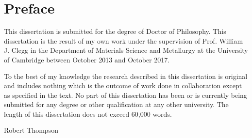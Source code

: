 
\clearpage

\doublespacing

\section*{Preface}



\noindent
This dissertation is submitted for the degree of Doctor of Philosophy. This dissertation is the result of my own work under the supervision of Prof. William J. Clegg in the Department of Materials Science and Metallurgy at the University of Cambridge between October 2013 and October 2017.
\par\bigskip
\noindent
To the best of my knowledge the research described in this dissertation is original and includes nothing which is the outcome of work done in collaboration except as specified in the text. No part of this dissertation has been or is currently being submitted for any degree or other qualification at any other university. The length of this dissertation does not exceed 60,000 words.
\par\bigskip



\par\bigskip

\par\bigskip

\par\bigskip

\par\bigskip

\par\bigskip


Robert Thompson
\singlespacing